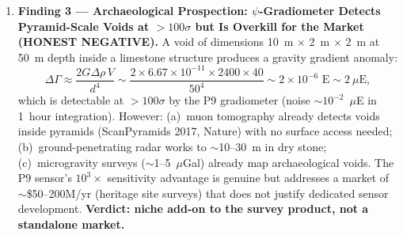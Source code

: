 \documentclass[11pt]{article}
\theoremstyle{definition}
\theoremstyle{remark}
\newcommand{\ee}[1]{\times10^{#1}}
\begin{document}
\begin{enumerate}
\item \textbf{Finding 3 --- Archaeological Prospection: $\psi$-Gradiometer
  Detects Pyramid-Scale Voids at $>100\sigma$ but Is Overkill for
  the Market (HONEST NEGATIVE).} A void of dimensions 10~m $\times$
  2~m $\times$ 2~m at 50~m depth inside a limestone structure
  produces a gravity gradient anomaly:
  \begin{equation}
    \Delta\Gamma \approx \frac{2 G \Delta\rho \, V}{d^4}
    \sim \frac{2 \times 6.67\ee{-11} \times 2400 \times 40}{50^4}
    \sim 2 \ee{-6} \text{ E} \sim 2~\mu\text{E},
  \end{equation}
  which is detectable at $>100\sigma$ by the P9 gradiometer (noise
  $\sim 10^{-2}$~$\mu$E in 1~hour integration). However: (a)~muon
  tomography already detects voids inside pyramids (ScanPyramids
  2017, Nature) with no surface access needed; (b)~ground-penetrating
  radar works to $\sim$10--30~m in dry stone; (c)~microgravity
  surveys ($\sim$1--5~$\mu$Gal) already map archaeological voids.
  The P9 sensor's $10^3\times$ sensitivity advantage is genuine but
  addresses a market of $\sim$\$50--200M/yr (heritage site surveys)
  that does not justify dedicated sensor development. \textbf{Verdict:
  niche add-on to the survey product, not a standalone market.}


\end{enumerate}
\end{document}
